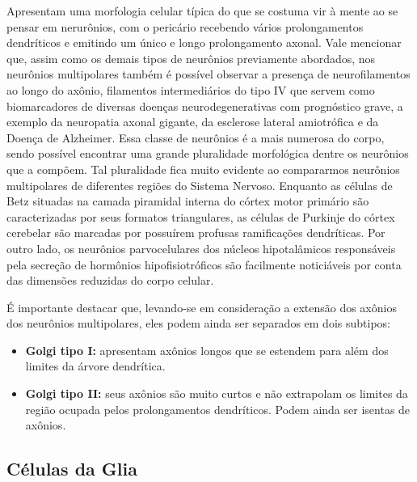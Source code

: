 \documentclass[
]{book}
\providecommand{\tightlist}{%
  \setlength{\itemsep}{0pt}\setlength{\parskip}{0pt}}
\begin{document}
Apresentam uma morfologia celular típica do que se costuma vir à mente ao se pensar em nerurônios, com o pericário recebendo vários prolongamentos dendríticos e emitindo um único e longo prolongamento axonal. Vale mencionar que, assim como os demais tipos de neurônios previamente abordados, nos neurônios multipolares também é possível observar a presença de neurofilamentos ao longo do axônio, filamentos intermediários do tipo IV que servem como biomarcadores de diversas doenças neurodegenerativas com prognóstico grave, a exemplo da neuropatia axonal gigante, da esclerose lateral amiotrófica e da Doença de Alzheimer. Essa classe de neurônios é a mais numerosa do corpo, sendo possível encontrar uma grande pluralidade morfológica dentre os neurônios que a compõem. Tal pluralidade fica muito evidente ao compararmos neurônios multipolares de diferentes regiões do Sistema Nervoso. Enquanto as células de Betz situadas na camada piramidal interna do córtex motor primário são caracterizadas por seus formatos triangulares, as células de Purkinje do córtex cerebelar são marcadas por possuírem profusas ramificações dendríticas. Por outro lado, os neurônios parvocelulares dos núcleos hipotalâmicos responsáveis pela secreção de hormônios hipofisiotróficos são facilmente noticiáveis por conta das dimensões reduzidas do corpo celular.

É importante destacar que, levando-se em consideração a extensão dos axônios dos neurônios multipolares, eles podem ainda ser separados em dois subtipos:

\begin{itemize}
\tightlist
\item
  \textbf{Golgi tipo I:} apresentam axônios longos que se estendem para além dos limites da árvore dendrítica.
\item
  \textbf{Golgi tipo II:} seus axônios são muito curtos e não extrapolam os limites da região ocupada pelos prolongamentos dendríticos. Podem ainda ser isentas de axônios.
\end{itemize}

\hypertarget{cuxe9lulas-da-glia}{%
\subsection*{Células da Glia}\label{cuxe9lulas-da-glia}}
\end{document}

